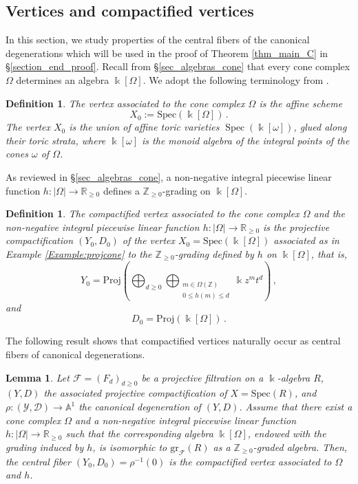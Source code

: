 \documentclass[12pt,letterpaper, reqno]{amsart}
\newtheorem{lemma}[theorem]{Lemma}
\theoremstyle{defstyle} \newtheorem{definition}[theorem]{Definition}
\theoremstyle{remark}
\numberwithin{equation}{section}
\numberwithin{figure}{section}
\newcommand{\cF} {\mathcal{F}}
\newcommand{\Spec} {\mathrm{Spec}}
\newcommand{\Proj} {\mathrm{Proj}}
\newcommand{\kk} {\Bbbk}
\newcommand{\A} {\mathbb{A}}
\newcommand{\RR} {\mathbb{R}}
\newcommand{\ZZ} {\mathbb{Z}}
\newcommand{\cY} {\mathcal{Y}}
\newcommand{\cD} {\mathcal{D}}
\begin{document}
\subsection{Vertices and compactified vertices}
\label{section_vertices}
In this section, we study properties of the central fibers of the canonical degenerations which will be used in the proof of Theorem \ref{thm_main_C} in \S \ref{section_end_proof}.
Recall from \S\ref{sec_algebras_cone} that every cone complex $\Omega$ determines an algebra $\kk[\Omega]$. We adopt the following terminology from \cite{GHK1}.

\begin{definition}
    The \emph{vertex} associated to the cone complex $\Omega$ is the affine scheme \[ X_0:=\Spec(\kk[\Omega])\,.\] 
The vertex $X_0$ is the union of affine toric varieties $\operatorname{Spec}(\kk[\omega])$, glued along their toric strata, where $\kk[\omega]$ is the monoid algebra of the integral points of the cones $\omega$ of $\Omega$.
\end{definition}

As reviewed in \S\ref{sec_algebras_cone}, a non-negative integral piecewise linear function $h: |\Omega| \rightarrow \RR_{\geq 0}$ defines a $\ZZ_{\geq 0}$-grading on $\kk[\Omega]$. 

\begin{definition} \label{def_comp_vertex}
    The \emph{compactified vertex} associated to the cone complex $\Omega$ and the non-negative integral piecewise linear function $h: |\Omega| \rightarrow \RR_{\geq 0}$ is the 
    projective compactification $(Y_0, D_0)$ of the vertex $X_0 = \Spec(\kk[\Omega])$ associated as in Example \ref{Example:projcone} to the $\ZZ_{\geq 0}$-grading defined by $h$ on $\kk[\Omega]$, that is, 
\[ Y_0 = \Proj \left( \bigoplus_{d \geq 0}  \bigoplus_{\substack{m \in \Omega(\ZZ) \\ 
0 \leq h(m) \leq d}} \kk z^m t^d   \right) \,,\]
    and 
    \[ D_0 = \Proj(\kk[\Omega]) \,.\]
\end{definition}

The following result shows that compactified vertices naturally occur as central fibers of canonical degenerations.

\begin{lemma}  \label{lem_central_vertex}
Let $\cF=(F_d)_{d\geq 0}$ be a projective filtration on a $\kk$-algebra $R$, $(Y,D)$
the associated projective compactification of $X=\Spec(R)$, and $\rho:(\cY, \cD) \rightarrow \A^1$ 
the canonical degeneration of $(Y,D)$. Assume that there exist a cone complex $\Omega$ and a 
non-negative integral piecewise linear function $h: |\Omega| \rightarrow \RR_{\geq 0}$ such that the corresponding algebra
$\kk[\Omega]$, endowed with the grading induced by $h$, is isomorphic to $\mathrm{gr}_\cF(R)$ as a $\ZZ_{\geq 0}$-graded algebra. 
Then, the central fiber $(Y_0,D_0)=\rho^{-1}(0)$ is the compactified vertex associated to 
$\Omega$ and $h$.
\end{lemma}
\end{document}
